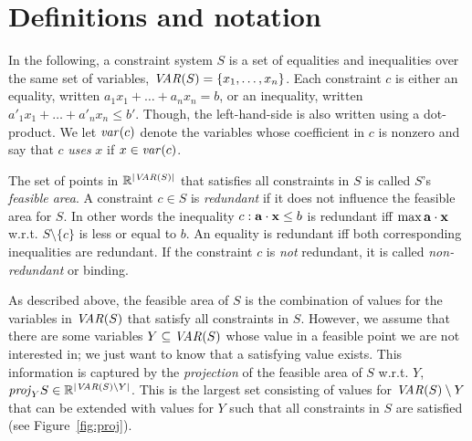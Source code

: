 %
%
\section{Definitions and notation}\label{sec:defs}
In the following, a constraint system $S$ is a set of equalities and inequalities over the same set of variables, $\mathit{VAR}(S)=\{x_1,\ldots, x_n\}$. 
Each constraint $c$ is either an equality, written $a_1x_1 + \ldots +a_nx_n = b$, or an inequality, written $a'_1x_1 + \ldots +a'_nx_n\leq b'$. Though, the left-hand-side is also written using a dot-product. 
%
We let $\mathit{var}(c)$ denote the variables whose coefficient in $c$ is nonzero and say that $c$ \emph{uses} $x$ if $x\in \mathit{var}(c)$.

The set of points in $\mathbb{R}^{|\mathit{VAR}(S)|}$ that satisfies all constraints in $S$ is called $S$'s \emph{feasible area}. A constraint $c\in S$ is \emph{redundant} if it does not influence the feasible area for $S$. In other words the inequality $c: \mathbf{a}\cdot\mathbf{x}\leq b$ is redundant iff $\max \mathbf{a}\cdot\mathbf{x}$ w.r.t. $S\setminus\{c\}$ is less or equal to $b$.
An equality is redundant iff both corresponding inequalities are redundant.
If the constraint $c$ is \emph{not} redundant, it is called \emph{non-redundant} or binding.

As described above, the feasible area of $S$ is the combination of values for the variables in $\mathit{VAR}(S)$ that satisfy all constraints in $S$. However, we assume that there are some variables $Y\subseteq \mathit{VAR}(S)$ whose value in a feasible point we are not interested in; we just want to know that a satisfying value exists. This information is captured by the \emph{projection} of the feasible area of $S$ w.r.t. $Y$, $\mathit{proj}_YS\in\mathbb{R}^{|\mathit{VAR}(S)\setminus Y|}$. This is the largest set consisting of values for $\mathit{VAR}(S)\setminus Y$ that can be extended with values for $Y$ such that all constraints in $S$ are satisfied (see Figure~\ref{fig:proj}). 

